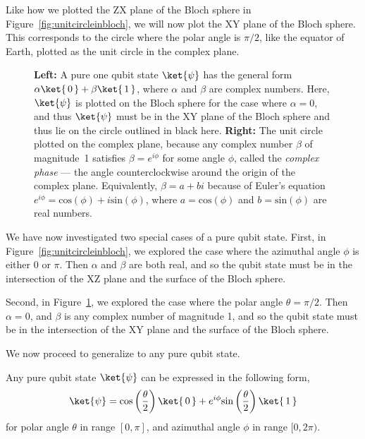 \documentclass{article}
\theoremstyle{definition}
\newcommand{\kz}[1]{\ket{\,#1\,}}
\begin{document}
Like how we plotted the ZX plane of the Bloch sphere in Figure~\ref{fig:unitcircleinbloch}, we will now plot the XY plane of the Bloch sphere.  This corresponds to the circle where the polar angle is $\pi/2$, like the equator of Earth, plotted as the unit circle in the complex plane.
\begin{figure}[H]
	\caption{\textbf{Left:} A pure one qubit state $\ket{\psi}$ has the general form $\alpha\kz0 + \beta\kz1$, where $\alpha$ and $\beta$ are complex numbers.  Here, $\ket{\psi}$ is plotted on the Bloch sphere for the case where $\alpha = 0$, and thus $\ket{\psi}$ must be in the XY plane of the Bloch sphere and thus lie on the circle outlined in black here.  \textbf{Right:} The unit circle plotted on the complex plane, because any complex number $\beta$ of magnitude~1 satisfies $\beta = e^{i \phi}$ for some angle $\phi$, called the \textit{complex phase} --- the angle counterclockwise around the origin of the complex plane.  Equivalently, $\beta = a + b i$ because of Euler's equation $e^{i \phi} = \text{cos}(\phi) + i \text{sin}(\phi)$, where $a = \text{cos}(\phi)$ and $b = \text{sin}(\phi)$ are real numbers.}
	\label{fig:unitcirclecomplexinbloch}
\end{figure}

We have now investigated two special cases of a pure qubit state.  First, in Figure~\ref{fig:unitcircleinbloch}, we explored the case where the azimuthal angle $\phi$ is either $0$ or $\pi$.  Then $\alpha$ and $\beta$ are both real, and so the qubit state must be in the intersection of the XZ plane and the surface of the Bloch sphere.

Second, in Figure~\ref{fig:unitcirclecomplexinbloch}, we explored the case where the polar angle $\theta = \pi/2$.  Then $\alpha = 0$, and $\beta$ is any complex number of magnitude 1, and so the qubit state must be in the intersection of the XY plane and the surface of the Bloch sphere.

We now proceed to generalize to any pure qubit state.

Any pure qubit state $\ket{\psi}$ can be expressed in the following form,
\begin{equation}
	\ket{\psi} = \text{cos}\left(\frac{\theta}{2}\right) \kz0 + e^{i \phi} \text{sin}\left(\frac{\theta}{2}\right) \kz1
	\label{eq:qubitinsphericalcoordinates}
\end{equation}
for polar angle $\theta$ in range $[0,\pi]$, and azimuthal angle $\phi$ in range $[0,2\pi)$.
\end{document}
